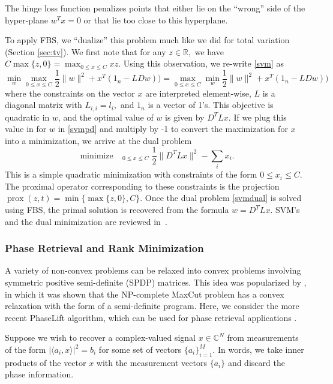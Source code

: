 \documentclass{amsart}
\newcommand{\half}{\frac{1}{2}}
\newcommand{\eqn}[2]{\begin{equation}\label{#1}#2\end{equation}}
\newcommand{\ra}{\rangle}
\newcommand{\la}{\langle}
\newcommand{\reals}{\mathbb{R}}
\newcommand{\comps}{\mathbb{C}}
\DeclareMathOperator*{\minimize}{minimize\quad}
\DeclareMathOperator{\prox}{prox}
\theoremstyle{definition}
\begin{document}
 The hinge loss function penalizes points that either lie on the ``wrong'' side of the hyper-plane $w^Tx=0$ or that lie too close to this hyperplane.
  
  To apply FBS, we ``dualize'' this problem much like we did for total variation (Section \ref{sec:tv}).  We first note that for any $z\in \reals,$ we have $C\max\{z,0\} = \max_{0\le x\le C} xz.$
   Using this observation, we re-write \eqref{svm} as
  \eqn{svmpd}{\min_{w} \max_{0\le x\le C}   \half \|w\|^2 + x^T(1_n- LDw))=\max_{0\le x\le C}   \min_{w}  \half \|w\|^2 + x^T(1_n- LDw))}
  where the constraints on the vector $x$ are interpreted element-wise, $L$ is a diagonal matrix with $L_{i,i} = l_i,$ and $1_n$ is a vector of 1's.  This objective is quadratic in $w$, and the optimal value of $w$ is given by $D^TLx.$  If we plug this value in for $w$ in \eqref{svmpd} and multiply by -1 to convert the maximization for $x$ into a minimization, we arrive at the dual problem
     \eqn{svmdual}{\minimize_{0\le x\le C} \half \|D^TLx\|^2- \sum_i x_i.}
     This is a simple quadratic minimization with constraints of the form $0\le x_i \le C.$ The proximal operator corresponding to these constraints is the projection $\prox(z,t) = \min\{\max\{z,0\},C\}.$ Once the dual problem \eqref{svmdual} is solved using FBS, the primal solution is recovered from the formula $w=D^TLx.$  SVM's and the dual minimization are reviewed in~\cite{SS04}.
      


 


\subsubsection{Phase Retrieval and Rank Minimization} \label{phase}
A variety of non-convex problems can be relaxed into convex problems involving symmetric positive semi-definite (SPDP) matrices.  
This  idea was popularized by \cite{GW95}, in which it was shown that the NP-complete MaxCut problem has a convex relaxation with the form of a  semi-definite program. Here, we consider the more recent PhaseLift algorithm, which can be used for phase retrieval applications \cite{CSV13}.

Suppose we wish to recover a complex-valued signal $x\in \comps^N$ from measurements of the form $|\la a_i,x \ra|^2 = b_i$ for some set of vectors $\{a_i\}_{i=1}^M.$  In words, we take inner products of the vector $x$ with the measurement vectors $\{a_i\}$ and discard the phase information.
\end{document}
